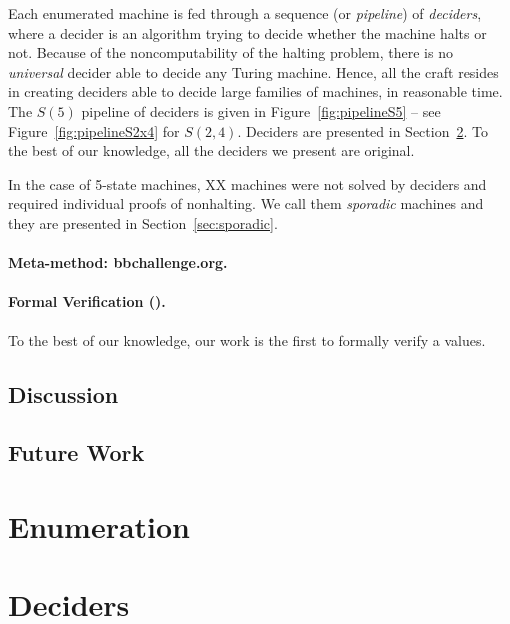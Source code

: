 \documentclass[a4paper,british]{article}
\theoremstyle{definition} %
\numberwithin{equation}{section}
\theoremstyle{definition} %
\newcommand{\ts}[1]{{\color{red}#1}}
\newcommand{\numSporadic}{\ts{XX}\xspace}
\begin{document}
Each enumerated machine is fed through a sequence (or \textit{pipeline}) of \textit{deciders}, where a decider is an algorithm trying to decide whether the machine halts or not. Because of the noncomputability of the halting problem, there is no \textit{universal} decider able to decide any Turing machine. Hence, all the craft resides in creating deciders able to decide large families of machines, in reasonable time. The $S(5)$ pipeline of deciders is given in Figure~\ref{fig:pipelineS5} -- see Figure~\ref{fig:pipelineS2x4} for $S(2,4)$. Deciders are presented in Section~\ref{sec:deciders}. To the best of our knowledge, all the deciders we present are original.

In the case of 5-state machines, \numSporadic machines were not solved by deciders and required individual proofs of nonhalting. We call them \textit{sporadic} machines and they are presented in Section~\ref{sec:sporadic}.

\paragraph{Meta-method: bbchallenge.org.}

\paragraph{Formal Verification (\Coq).} To the best of our knowledge, our work is the first to formally verify a \BBfull values.

\subsection{Discussion}
\subsection{Future Work}



\section{Enumeration}\label{sec:enum}
\section{Deciders}\label{sec:deciders}



% 

% 
% 
% 
\end{document}
